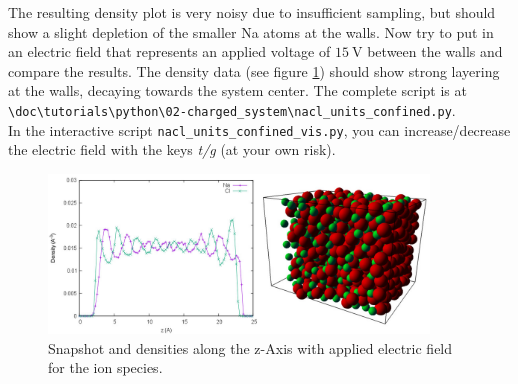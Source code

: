\documentclass[
a4paper,                        %
11pt,                           %
twoside,                        %
footsepline,                    %
headsepline,                    %
headexclude,                    %
footexclude,                    %
pagesize,                       %
]{scrartcl}
\begin{document}
The resulting density plot is very noisy due to insufficient sampling, but should show a slight depletion of the smaller Na atoms
at the walls. Now try to put in an electric field that represents an applied voltage of $15 \ \mathrm{V}$ between the walls and compare the results.
The density data (see figure \ref{fig:nacl_confined}) should show strong layering at the walls, decaying towards the system center.
The complete script is at \\
\verb|\doc\tutorials\python\02-charged_system\nacl_units_confined.py|.\\
In the interactive script \verb|nacl_units_confined_vis.py|, you can increase/decrease the electric field with the keys \emph{t/g} (at your own risk).

\begin{figure}[tb]
  \centering
  \includegraphics[width=0.9\textwidth]{figures/nacl_units_confined}
  \caption{Snapshot and densities along the z-Axis with applied electric field for the ion species.}
  \label{fig:nacl_confined}
\end{figure}
\end{document}
